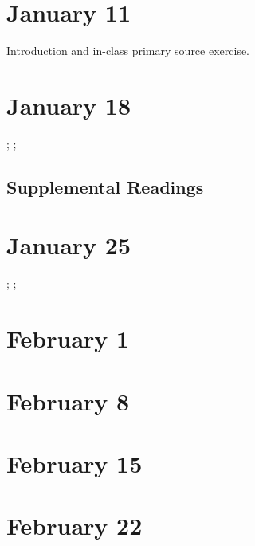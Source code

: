 \documentclass[11pt]{article}
\begin{document}
\small
\let\realeverypar\everypar
\realeverypar{\the\myeverypar\the\everypar}%
\newtoks\everypar %
\everypar{}
\newtoks\myeverypar \myeverypar{}

\myeverypar{\hangindent=1cm \small}

\section{January 11}

Introduction and in-class primary source exercise.

\cite{Turkle:1984hack}


\section{January 18}

\cite{Scott:1986ik}; \cite{Cowan:1976wda}; 
\cite{Oldenziel:1997to}

\subsection{Supplemental Readings}

\cite{Cowan:1983vm}


\section{January 25}

\cite{Bray:2007cb}; \cite{Kleif:2003wg}; \cite{Fischer:1988wl}

\section{February 1}

\cite{Oldenziel:1999vk}

\section{February 8}

\cite{Strom:1992wx}

\section{February 15}

\cite{Hicks:2016uj}

\section{February 22}
\end{document}
